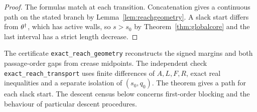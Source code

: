 \begin{proof}
The formulas match at each transition. Concatenation gives a continuous path on the stated branch by Lemma~\ref{lem:reachgeometry}. A slack start differs from $\theta^\dagger$, which has active walls, so $s>s_0$ by Theorem~\ref{thm:globalcore} and the last interval has a strict length decrease.
\end{proof}

The certificate \texttt{exact\_reach\_geometry} reconstructs the signed margins and both passage-order gaps from crease midpoints. The independent check \texttt{exact\_reach\_transport} uses finite differences of $A,L,F,R$, exact real inequalities and a separate isolation of $(s_0,q_0)$. The theorem gives a path for each slack start. The descent census below concerns first-order blocking and the behaviour of particular descent procedures.
